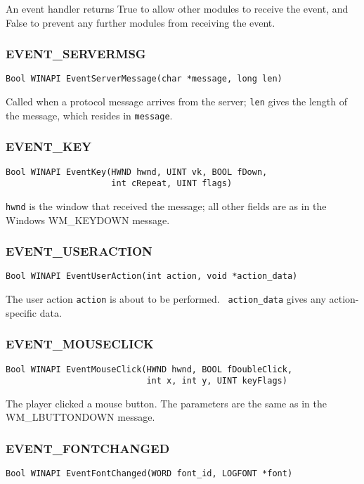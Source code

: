 An event handler returns True to allow other modules to receive the
event, and False to prevent any further modules from receiving the event.

\subsubsection{EVENT\_SERVERMSG}
\begin{verbatim}
Bool WINAPI EventServerMessage(char *message, long len)
\end{verbatim}

Called when a protocol message arrives from the server; {\tt len}
gives the length of the message, which resides in {\tt message}.

\subsubsection{EVENT\_KEY}
\begin{verbatim}
Bool WINAPI EventKey(HWND hwnd, UINT vk, BOOL fDown, 
                     int cRepeat, UINT flags)
\end{verbatim}

{\tt hwnd} is the window that received the message; all other fields
are as in the Windows WM\_KEYDOWN message.

\subsubsection{EVENT\_USERACTION}
\begin{verbatim}
Bool WINAPI EventUserAction(int action, void *action_data)
\end{verbatim}

The user action {\tt action} is about to be performed.  {\tt
action\_data} gives any action-specific data.

\subsubsection{EVENT\_MOUSECLICK}
\begin{verbatim}
Bool WINAPI EventMouseClick(HWND hwnd, BOOL fDoubleClick, 
                            int x, int y, UINT keyFlags)
\end{verbatim}

The player clicked a mouse button.  The parameters are the same as in
the WM\_LBUTTONDOWN message.

\subsubsection{EVENT\_FONTCHANGED}
\begin{verbatim}
Bool WINAPI EventFontChanged(WORD font_id, LOGFONT *font)
\end{verbatim}


